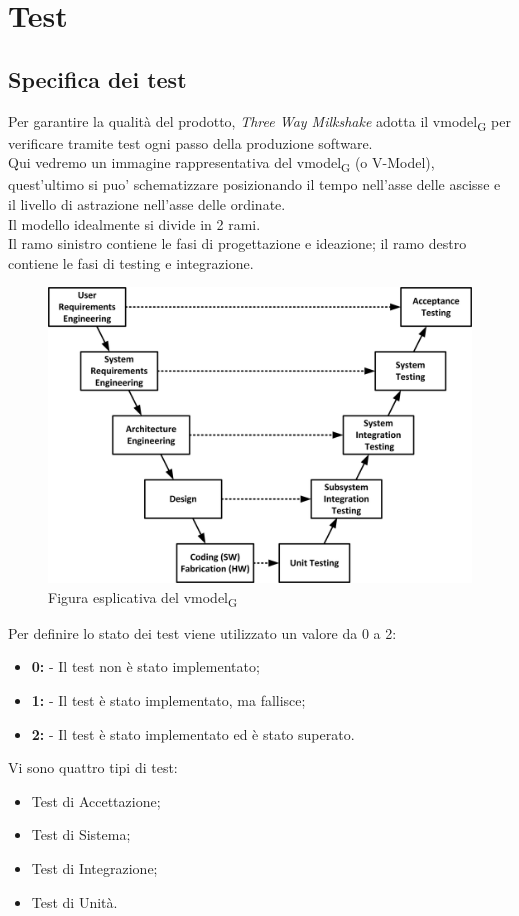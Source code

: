 \section{Test}

\subsection{Specifica dei test}

Per garantire la qualità del prodotto, \textit{Three Way Milkshake} adotta il \gls{vmodel}\textsubscript{G} per verificare tramite test ogni passo della produzione software.\\Qui vedremo un immagine rappresentativa del \gls{vmodel}\textsubscript{G} (o V-Model), quest'ultimo si puo' schematizzare posizionando il tempo nell'asse delle ascisse e il livello di astrazione nell'asse delle ordinate.\\Il modello idealmente si divide in 2 rami.\\Il ramo sinistro contiene le fasi di progettazione e ideazione; il ramo destro contiene le fasi di testing e integrazione.
\begin{figure}[h!]
	\centering
	\includegraphics[scale=0.6]{res/images/v_model.jpg}
	\caption{Figura esplicativa del \gls{vmodel}\textsubscript{G}}
\end{figure}

Per definire lo stato dei test viene utilizzato un valore da 0 a 2:
\begin{itemize}
	\item \textbf{0:} - Il test non è stato implementato;
	\item \textbf{1:} - Il test è stato implementato, ma fallisce;
	\item \textbf{2:} - Il test è stato implementato ed è stato superato.
\end{itemize}
Vi sono quattro tipi di test:
\begin{itemize}
	\item Test di Accettazione;
	\item Test di Sistema;
	\item Test di Integrazione;
	\item Test di Unità.
\end{itemize}
